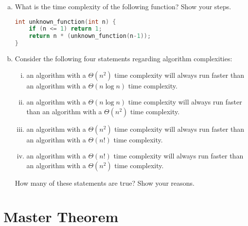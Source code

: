 \documentclass[11pt]{exam}
\begin{document}
\begin{enumerate}[(a)]
\item What is the time complexity of the following function? Show your steps.
\begin{lstlisting}[language=c++]
int unknown_function(int n) {
	if (n <= 1) return 1;
	return n * (unknown_function(n-1));
}
\end{lstlisting}
\begin{solution}
\end{solution}

\item Consider the following four statements regarding algorithm complexities:
\begin{enumerate}[i)]
\item an algorithm with a $\Theta(n^2)$ time complexity will always run faster than an algorithm with a $\Theta(n \log n)$ time complexity.
\item an algorithm with a $\Theta(n \log n)$ time complexity will always run faster than an algorithm with a $\Theta(n^2)$ time complexity.
\item an algorithm with a $\Theta(n^2)$ time complexity will always run faster than an algorithm with a $\Theta(n!)$ time complexity.
\item an algorithm with a $\Theta(n!)$ time complexity will always run faster than an algorithm with a $\Theta(n^2)$ time complexity.
\end{enumerate}

How many of these statements are true? Show your reasons.
\begin{solution}
\end{solution}

\end{enumerate}

\section{Master Theorem}
\end{document}
